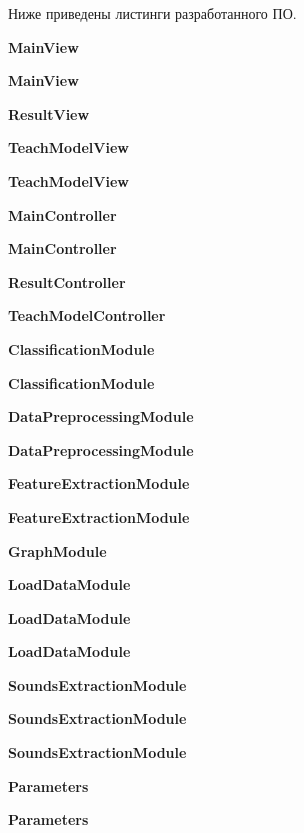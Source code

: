 \documentclass[utf8x, 14pt, oneside, a4paper]{article}
\begin{document}
	Ниже приведены листинги разработанного ПО.

	{\bf MainView}
	
	\newpage
	{\bf MainView}
	
	\newpage
	{\bf ResultView}
	
	\newpage
	{\bf TeachModelView}
	
	\newpage
	{\bf TeachModelView}
	
	
	{\bf MainController}
	
	\newpage
	{\bf MainController}
	
	\newpage
	{\bf ResultController}
	
	{\bf TeachModelController}
	

	\newpage
	
	{\bf ClassificationModule}
	
	\newpage
	{\bf ClassificationModule}
	
	\newpage
	{\bf DataPreprocessingModule}
	
	\newpage
	{\bf DataPreprocessingModule}
	
	\newpage
	{\bf FeatureExtractionModule}
	
	\newpage
	{\bf FeatureExtractionModule}
	
	\newpage
	{\bf GraphModule}
	
	{\bf LoadDataModule}
	
	\newpage
	{\bf LoadDataModule}
	
	\newpage
	{\bf LoadDataModule}
	
	{\bf SoundsExtractionModule}
	
	\newpage
	{\bf SoundsExtractionModule}
	
	\newpage
	{\bf SoundsExtractionModule}
	
	\newpage
	{\bf Parameters}
	
	
	
	\newpage
	{\bf Parameters}
	
	
	\pagebreak
	
\end{document}

